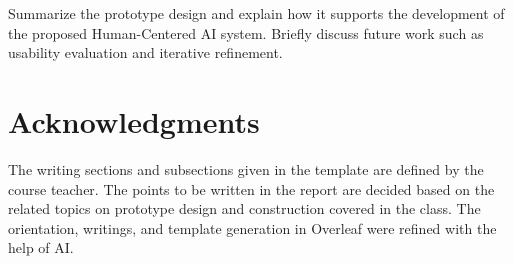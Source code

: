 \documentclass[sigconf]{acmart}
\begin{document}
Summarize the prototype design and explain how it supports the development of the proposed Human-Centered AI system. Briefly discuss future work such as usability evaluation and iterative refinement.

\section*{Acknowledgments}

The writing sections and subsections given in the template are defined by the course teacher. The points to be written in the report are decided based on the related topics on prototype design and construction covered in the class. The orientation, writings, and template generation in Overleaf were refined with the help of AI. 



\end{document}

